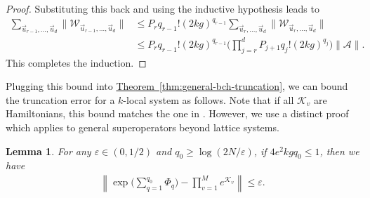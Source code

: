 \documentclass[11pt]{article}
\newtheorem{lemma}{Lemma}
\newcommand{\thm}[1]{\hyperref[thm:#1]{Theorem~\ref*{thm:#1}}}
\newcommand{\eps}{\varepsilon}
\newcommand{\mc}{\mathcal}
\begin{document}
\begin{proof}
    Substituting this back and using the inductive hypothesis leads to
    \begin{align*}
        \sum_{\vec{u}_{r-1}, \ldots, \vec{u}_d} \Big\|\mathcal{W}_{\vec{u}_{r-1}, \ldots, \vec{u}_d}\Big\| 
        &\le P_r q_{r-1}! (2kg)^{q_{r-1}} \sum_{\vec{u}_{r}, \ldots, \vec{u}_d} \Big\|\mathcal{W}_{\vec{u}_{r}, \ldots, \vec{u}_d}\Big\| \\
        &\le P_r q_{r-1}! (2kg)^{q_{r-1}}  \bigg(\prod_{j=r}^{d}P_{j+1} q_j!(2kg)^{q_j}\bigg)\|\mc A\|.
    \end{align*}
    This completes the induction.
\end{proof}

Plugging this bound into \thm{general-bch-truncation}, we can bound the truncation error for a $k$-local system as follows. Note that if all $\mathcal{K}_v$ are Hamiltonians, this bound matches the one in \citet[Theorem 3]{mizuta2025commutator}. However, we use a distinct proof which applies to general superoperators beyond lattice systems.
\begin{lemma}
\label{lem:bch-approx} 
    For any $\eps\in (0,1/2)$ and  $q_0 \ge \log(2N/\eps)$, if $4e^2kgq_0\le 1$, then we have \begin{align*}
        \left\|\exp\Big(\sum_{q=1}^{q_0} \Phi_q\Big) - \prod_{v = 1}^Me^{\mc K_v} \right\|\le \eps.
    \end{align*}
\end{lemma}
\end{document}
